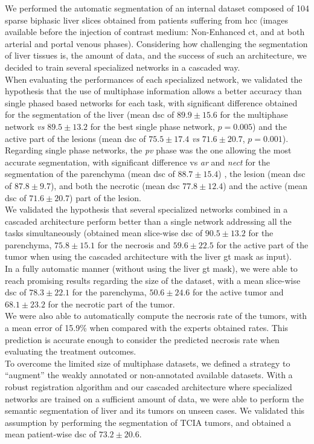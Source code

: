 We performed the automatic segmentation of an internal dataset composed
of 104 sparse biphasic liver slices obtained from patients suffering
from \ac{hcc} (images available before the injection of contrast medium:
Non-Enhanced \ac{ct}, and at both arterial and portal venous phases).
Considering how challenging the segmentation of liver tissues is, the
amount of data, and the success of such an architecture, we decided to
train several specialized networks in a cascaded way.\\
When evaluating the performances of each specialized network, we
validated the hypothesis that the use of multiphase information allows a
better accuracy than single phased based networks for each task,
with significant difference obtained for the segmentation of the liver
(mean \ac{dsc} of $ 89.9 \pm 15.6 $ for the multiphase network \emph{vs} $ 89.5 \pm
13.2 $ for the best single phase network, $p = 0.005$) and the active part of the
lesions (mean \ac{dsc} of $ 75.5 \pm 17.4 $ \emph{vs} $ 71.6 \pm 20.7 $, $p = 0.001$).\\
Regarding single phase networks, the \emph{\ac{pv}} phase was the one
allowing the most accurate segmentation, with significant difference vs
\emph{\ac{ar}} and \emph{\ac{nect}} for the segmentation of the parenchyma (mean
\ac{dsc} of $ 88.7 \pm 15.4 $) , the lesion (mean \ac{dsc} of $ 87.8 \pm 9.7 $), and both the
necrotic (mean \ac{dsc} $ 77.8 \pm 12.4 $) and the active (mean \ac{dsc} of $ 71.6 \pm 20.7 $)
part of the lesion. \\
We validated the hypothesis that several specialized networks combined
in a cascaded architecture perform better than a single network
addressing all the tasks simultaneously (obtained mean slice-wise \ac{dsc} of
$ 90.5 \pm 13.2 $ for the parenchyma, $ 75.8 \pm 15.1 $ for the necrosis and $ 59.6 \pm
22.5 $ for the active part of the tumor when using the cascaded
architecture with the liver \ac{gt} mask as input).\\
In a fully automatic manner (without using the liver \ac{gt} mask), we were
able to reach promising results regarding the size of the dataset, with
a mean slice-wise \ac{dsc} of $ 78.3 \pm 22.1 $ for the parenchyma, $ 50.6 \pm 24.6 $ for
the active tumor and $ 68.1 \pm 23.2 $ for the necrotic part of the tumor.\\
We were also able to automatically compute the necrosis rate of the
tumors, with a mean error of 15.9\% when compared with the experts
obtained rates. This prediction is accurate enough to consider the
predicted necrosis rate when evaluating the treatment outcomes. \\
To overcome the limited size of multiphase datasets, we defined a
strategy to ``augment'' the weakly annotated or non-annotated available
datasets.
With a robust registration algorithm and our cascaded architecture where
specialized networks are trained on a sufficient amount of data, we were
able to perform the semantic segmentation of liver and its tumors on
unseen cases.
We validated this assumption by performing the segmentation of TCIA
tumors, and obtained a mean patient-wise \ac{dsc} of $ 73.2 \pm 20.6 $.

